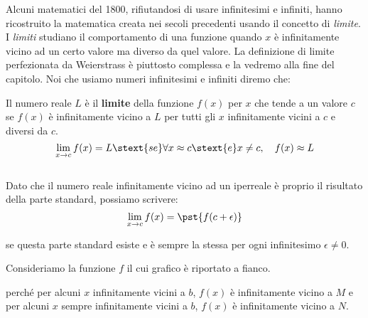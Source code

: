 
Alcuni matematici del 1800, rifiutandosi di usare infinitesimi e infiniti, 
hanno ricostruito la matematica creata nei secoli precedenti usando il 
concetto di \emph{limite}.
I \emph{limiti} studiano il comportamento di una funzione quando \(x\) è 
infinitamente vicino ad un certo valore ma diverso da quel valore.
La definizione di limite perfezionata da Weierstrass è piuttosto 
complessa e la vedremo alla fine del capitolo.
Noi che usiamo numeri infinitesimi e infiniti diremo che:

\begin{definizione}
Il numero reale \(L\) è il \textbf{limite} della funzione \(f(x)\) 
per \(x\) che tende a un valore \(c\) se \(f(x)\) è infinitamente vicino a 
\(L\) per tutti gli \(x\) infinitamente vicini a \(c\) e diversi da 
\(c\).
\[\lim_{x \to c} f(x) = L \stext{ se } \forall x \approx c \stext{ e } 
x \neq c, \quad f(x) \approx L\] \\
Dato che il numero reale infinitamente vicino ad un iperreale è proprio il 
risultato della parte standard, possiamo scrivere:
\[\lim_{x \to c} f(x) = \pst{f(c + \epsilon)} \]

\vspace{-1.5em}
\begin{center} 
se questa parte standard esiste e è sempre la stessa 
per ogni infinitesimo \(\epsilon \neq 0\).
\end{center}
\end{definizione}

\begin{esempio}
Consideriamo la funzione \(f\) il cui grafico è riportato a fianco.

perché per alcuni \(x\) infinitamente vicini a \(b\), \(f(x)\) è 
infinitamente vicino a \(M\) e per alcuni \(x\) sempre infinitamente 
vicini a \(b\), \(f(x)\) è infinitamente vicino a \(N\).
\end{esempio}

